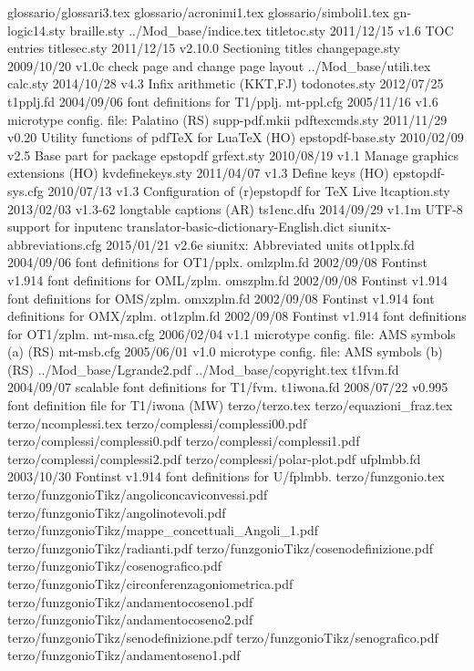 glossario/glossari3.tex
glossario/acronimi1.tex
glossario/simboli1.tex
gn-logic14.sty    
 braille.sty    
../Mod_base/indice.tex
titletoc.sty    2011/12/15 v1.6 TOC entries
titlesec.sty    2011/12/15 v2.10.0 Sectioning titles
changepage.sty    2009/10/20 v1.0c check page and change page layout
../Mod_base/utili.tex
    calc.sty    2014/10/28 v4.3 Infix arithmetic (KKT,FJ)
todonotes.sty    2012/07/25
  t1pplj.fd    2004/09/06 font definitions for T1/pplj.
  mt-ppl.cfg    2005/11/16 v1.6 microtype config. file: Palatino (RS)
supp-pdf.mkii
pdftexcmds.sty    2011/11/29 v0.20 Utility functions of pdfTeX for LuaTeX (HO)
epstopdf-base.sty    2010/02/09 v2.5 Base part for package epstopdf
  grfext.sty    2010/08/19 v1.1 Manage graphics extensions (HO)
kvdefinekeys.sty    2011/04/07 v1.3 Define keys (HO)
epstopdf-sys.cfg    2010/07/13 v1.3 Configuration of (r)epstopdf for TeX Live
ltcaption.sty    2013/02/03 v1.3-62 longtable captions (AR)
  ts1enc.dfu    2014/09/29 v1.1m UTF-8 support for inputenc
translator-basic-dictionary-English.dict    
siunitx-abbreviations.cfg    2015/01/21 v2.6e siunitx: Abbreviated units
 ot1pplx.fd    2004/09/06 font definitions for OT1/pplx.
 omlzplm.fd    2002/09/08 Fontinst v1.914 font definitions for OML/zplm.
 omszplm.fd    2002/09/08 Fontinst v1.914 font definitions for OMS/zplm.
 omxzplm.fd    2002/09/08 Fontinst v1.914 font definitions for OMX/zplm.
 ot1zplm.fd    2002/09/08 Fontinst v1.914 font definitions for OT1/zplm.
  mt-msa.cfg    2006/02/04 v1.1 microtype config. file: AMS symbols (a) (RS)
  mt-msb.cfg    2005/06/01 v1.0 microtype config. file: AMS symbols (b) (RS)
../Mod_base/Lgrande2.pdf
../Mod_base/copyright.tex
   t1fvm.fd    2004/09/07 scalable font definitions for T1/fvm.
 t1iwona.fd    2008/07/22 v0.995 font definition file for T1/iwona (MW)
terzo/terzo.tex
terzo/equazioni_fraz.tex
terzo/ncomplessi.tex
terzo/complessi/complessi00.pdf
terzo/complessi/complessi0.pdf
terzo/complessi/complessi1.pdf
terzo/complessi/complessi2.pdf
terzo/complessi/polar-plot.pdf
 ufplmbb.fd    2003/10/30 Fontinst v1.914 font definitions for U/fplmbb.
terzo/funzgonio.tex
terzo/funzgonioTikz/angoliconcaviconvessi.pdf
terzo/funzgonioTikz/angolinotevoli.pdf
terzo/funzgonioTikz/mappe_concettuali_Angoli_1.pdf
terzo/funzgonioTikz/radianti.pdf
terzo/funzgonioTikz/cosenodefinizione.pdf
terzo/funzgonioTikz/cosenografico.pdf
terzo/funzgonioTikz/circonferenzagoniometrica.pdf
terzo/funzgonioTikz/andamentocoseno1.pdf
terzo/funzgonioTikz/andamentocoseno2.pdf
terzo/funzgonioTikz/senodefinizione.pdf
terzo/funzgonioTikz/senografico.pdf
terzo/funzgonioTikz/andamentoseno1.pdf
